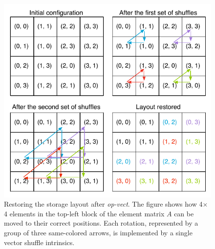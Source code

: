 \documentclass[conference]{IEEEtran}
\begin{document}
\begin{figure}[t]
\centerline{\includegraphics[scale=0.7]{Pictures/vect-restore.pdf}}
\caption{Restoring the storage layout after \emph{op-vect}. The figure shows how 4$\times$4 elements in the top-left block of the element matrix $A$ can be moved to their correct positions. Each rotation, represented by a group of three same-colored arrows, is implemented by a single vector shuffle intrinsics.}
\label{fig:restore-layout}
\end{figure}

\end{document}
